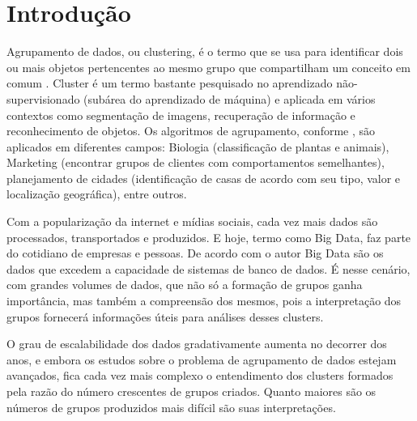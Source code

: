 

\chapter{Introdução} \label{cap:introd}

Agrupamento de dados, ou clustering, é o termo que se usa para identificar dois ou mais objetos pertencentes ao mesmo grupo que compartilham um conceito em comum \cite{Kumar2013}. Cluster é um termo bastante pesquisado no aprendizado não-supervisionado (subárea do aprendizado de máquina) e  aplicada em vários contextos como segmentação de imagens, recuperação de informação e reconhecimento de objetos. Os algoritmos de agrupamento, conforme , são aplicados em diferentes campos: Biologia (classificação de plantas e animais), Marketing (encontrar grupos de clientes com comportamentos semelhantes), planejamento de cidades (identificação de casas de acordo com seu tipo, valor e localização geográfica), entre outros.

Com a popularização da internet e mídias sociais, cada vez mais dados são processados, transportados e produzidos. E hoje, termo como Big Data, faz parte do cotidiano de empresas e pessoas. De acordo com o autor  Big Data são os dados que excedem a capacidade de sistemas de banco de dados. É nesse cenário, com grandes volumes de dados, que não só a formação de grupos ganha importância, mas também a compreensão dos mesmos, pois a interpretação dos grupos fornecerá informações úteis para análises desses clusters.


O grau de escalabilidade dos dados gradativamente aumenta no decorrer dos anos, e embora os estudos sobre o problema de agrupamento de dados estejam avançados, fica cada vez mais complexo o entendimento dos clusters formados pela razão do número crescentes de grupos criados. Quanto maiores são os números de grupos produzidos mais  difícil são suas interpretações. 

